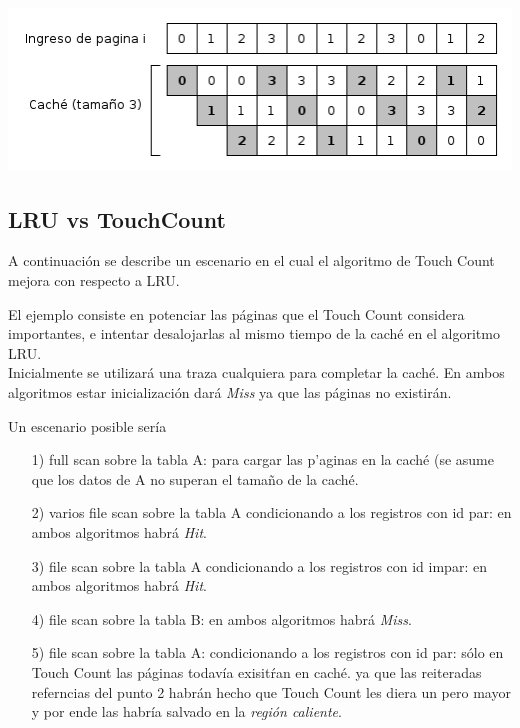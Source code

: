 \documentclass[11pt, a4paper, spanish]{article}
\begin{document}
	\begin{center}
	\includegraphics[scale=0.65]{diagramas/LRUPathological.png}\\
	\end{center}

\subsection{ LRU vs TouchCount}

A continuaci\'on se describe un escenario en el cual el algoritmo de Touch Count mejora con respecto a LRU.

El ejemplo consiste en potenciar las p\'aginas que el Touch Count considera importantes, e intentar desalojarlas al mismo tiempo de la cach\'e en el
algoritmo LRU.\\

Inicialmente se utilizar\'a una traza cualquiera para completar la cach\'e. En ambos algoritmos estar inicializaci\'on dar\'a \textit{Miss} ya que
las p\'aginas no existir\'an.

Un escenario posible ser\'ia

\begin{itemize}
	\item[1)] full scan sobre la tabla A: para cargar las p'aginas en la cach\'e (se asume que los datos de A no superan el tama\~{n}o de la cach\'e.
	\item[2)] varios file scan sobre la tabla A condicionando a los registros con id par: en ambos algoritmos habr\'a \textit{Hit}.
	\item[3)] file scan sobre la tabla A condicionando a los registros con id impar: en ambos algoritmos habr\'a \textit{Hit}.
	\item[4)] file scan sobre la tabla B: en ambos algoritmos habr\'a \textit{Miss}.
	\item[5)] file scan sobre la tabla A: condicionando a los registros con id par: s\'olo en Touch Count las p\'aginas todav\'ia exisit\'ran en cach\'e.
ya que las reiteradas referncias del punto 2 habr\'an hecho que Touch Count les diera un pero mayor y por ende las habr\'ia salvado en la \textit{regi\'on caliente}.
\end{itemize}
\end{document}
